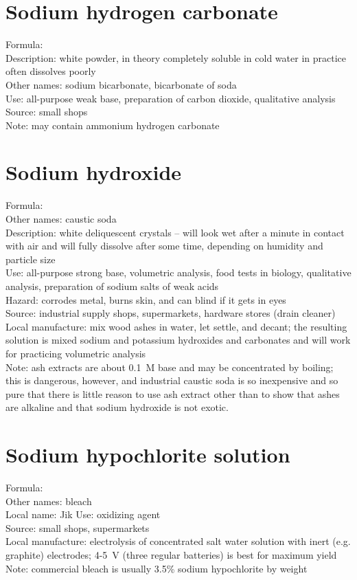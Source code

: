 \section{Sodium hydrogen carbonate}
Formula: \\
Description: white powder, 
in theory completely soluble in cold water 
in practice often dissolves poorly\\
Other names: sodium bicarbonate, 
bicarbonate of soda\\
Use: all-purpose weak base, 
preparation of carbon dioxide, 
qualitative analysis\\
Source: small shops \\
Note: may contain ammonium hydrogen carbonate

\section{Sodium hydroxide}
Formula: \\
Other names: caustic soda\\
Description: white deliquescent crystals -- 
will look wet after a minute in contact with air 
and will fully dissolve after some time, 
depending on humidity and particle size\\ 
Use: all-purpose strong base, 
volumetric analysis, 
food tests in biology, 
qualitative analysis, 
preparation of sodium salts of weak acids\\
Hazard: corrodes metal, 
burns skin, 
and can blind if it gets in eyes\\
Source: industrial supply shops, 
supermarkets, 
hardware stores (drain cleaner)\\
Local manufacture: mix wood ashes in water, 
let settle, 
and decant; 
the resulting solution is mixed sodium and potassium hydroxides 
and carbonates and will work for practicing volumetric analysis\\
Note: ash extracts are about 0.1~M base and may be concentrated by boiling; 
this is dangerous, 
however, 
and industrial caustic soda is so inexpensive 
and so pure that there is little reason to use ash extract 
other than to show that ashes are alkaline 
and that sodium hydroxide is not exotic.

\section{Sodium hypochlorite solution}
Formula: \\
Other names: bleach\\
Local name: Jik
Use: oxidizing agent\\
Source: small shops, 
supermarkets\\
Local manufacture: electrolysis of concentrated salt water solution 
with inert (e.g. 
graphite) electrodes; 
4-5~V (three regular batteries) is best for maximum yield\\
Note: commercial bleach is usually 3.5\% sodium hypochlorite by weight

